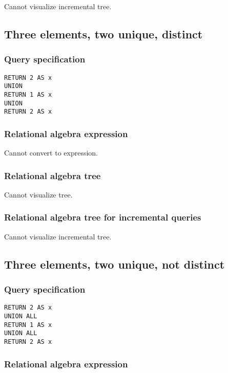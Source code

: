 Cannot visualize incremental tree.

\subsection{Three elements, two unique, distinct}

\subsubsection*{Query specification}

\begin{lstlisting}
RETURN 2 AS x
UNION
RETURN 1 AS x
UNION
RETURN 2 AS x
\end{lstlisting}

\subsubsection*{Relational algebra expression}

Cannot convert to expression.

\subsubsection*{Relational algebra tree}

Cannot visualize tree.

\subsubsection*{Relational algebra tree for incremental queries}

Cannot visualize incremental tree.

\subsection{Three elements, two unique, not distinct}

\subsubsection*{Query specification}

\begin{lstlisting}
RETURN 2 AS x
UNION ALL
RETURN 1 AS x
UNION ALL
RETURN 2 AS x
\end{lstlisting}

\subsubsection*{Relational algebra expression}

